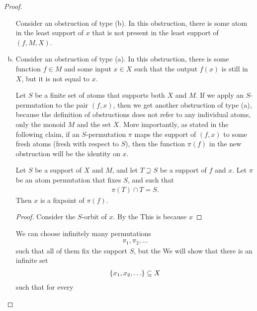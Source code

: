 \begin{proof}
\begin{enumerate}[(a)]
        Consider an obstruction of type (b). In this obstruction, there is some atom in the least support of $x$ that is not present in the least support of $(f,M,X)$. 
        \item     Consider an obstruction of type (a). In this obstruction, there is some function $f \in M$ and some input $x \in X$ such that the output $f(x)$ is still in $X$, but it is not equal to $x$. 
        
        Let $S$ be a finite set of atoms that supports both $X$ and $M$. If we apply an $S$-permutation to the pair $(f,x)$, then we get another obstruction of type (a), because the definition of obstructions does not refer to any individual atoms, only the monoid $M$ and the set $X$. More importantly, as stated in the following claim, if an $S$-permutation $\pi$ maps the support of $(f,x)$ to some fresh atoms (fresh with respect to $S$), then the function $\pi(f)$ in the new obstruction will be the identity on $x$. 
        
        \begin{claim}
            Let $S$ be a support of $X$ and $M$, and let $T \supseteq S$ be a support of $f$ and $x$. 
            Let $\pi$ be an atom permutation that fixes $S$, and such that 
            \begin{align*}
            \pi(T) \cap T =  S.
            \end{align*}
            Then $x$ is a fixpoint of $\pi(f)$. 
        \end{claim}
        \begin{proof}
            Consider the $S$-orbit of $x$. By the 
            This is because $x$ 
        \end{proof}
        We can choose infinitely many permutations 
        \begin{align*}
        \pi_1, \pi_2, \ldots
        \end{align*}
        such that all of them fix the support $S$, but the 
        We will show that there is an infinite set 
        \begin{align*}
        \{x_1,x_2,\ldots\} \subseteq X
        \end{align*}
        such that for every  
    \end{enumerate}

\end{proof}

